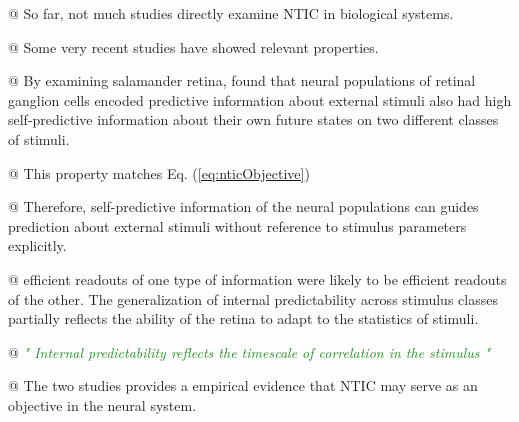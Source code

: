 \documentclass[utf8]{article}
\newenvironment{ants}
			{
			 \begin{easylist}[itemize]		
		 	}
			{
			\end{easylist}
			}
\newcommand{\rewrite}[1]{\textcolor{ForestGreen}{\textit{"#1"}}\newline}
\begin{document}
		
			\begin{ants}
				@ So far, not much studies directly examine NTIC in biological systems. 
				
				@ Some very recent studies have showed relevant properties.
				
				@ By examining salamander retina, \cite{Palmer2015, sederberg2018learning} found that neural populations of retinal ganglion cells encoded predictive information about external stimuli also had high self-predictive information about their own future states on two different classes of stimuli. 
				
				@ This property matches Eq. (\ref{eq:nticObjective})
				
				@ Therefore, self-predictive information of the neural populations can guides  prediction about external stimuli without reference to stimulus parameters explicitly. 
				
				@ efficient readouts of one type of information were likely to be efficient readouts of the other. The generalization of internal predictability across stimulus classes partially reflects the ability of the retina to adapt to the statistics of stimuli.
				
				@ \rewrite{ Internal predictability reflects the timescale of correlation in the stimulus }
				
				
				@ The two studies provides a empirical evidence that NTIC may serve as an objective in the neural system. 
			\end{ants}
				
\end{document}

